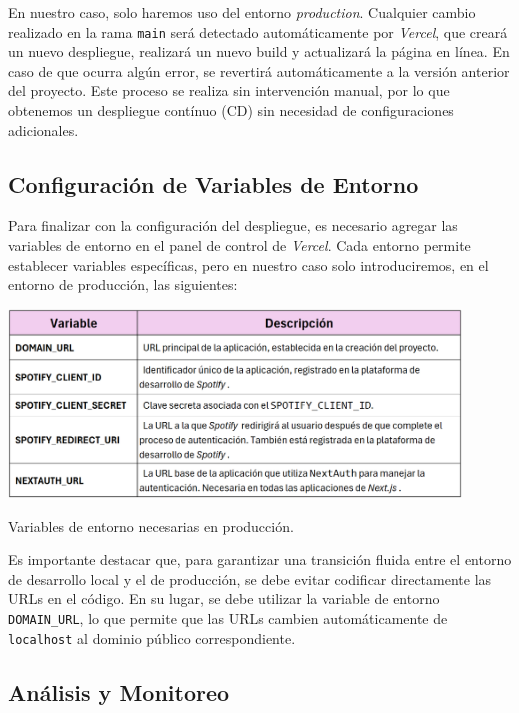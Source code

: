 En nuestro caso, solo haremos uso del entorno \textit{production}. Cualquier cambio realizado en la rama \texttt{main} será detectado automáticamente por \textit{Vercel}, que creará un nuevo despliegue, realizará un nuevo build y actualizará la página en línea. En caso de que ocurra algún error, se revertirá automáticamente a la versión anterior del proyecto. Este proceso se realiza sin intervención manual, por lo que obtenemos un despliegue contínuo (CD) sin necesidad de configuraciones adicionales.

\subsection{Configuración de Variables de Entorno}

Para finalizar con la configuración del despliegue, es necesario agregar las variables de entorno en el panel de control de \textit{Vercel}. Cada entorno permite establecer variables específicas, pero en nuestro caso solo introduciremos, en el entorno de producción, las siguientes:

\begin{table}[htbp]
    \centering
    \includegraphics[width=0.9\textwidth]{figures/despliegue/variables_entorno.png}
    \captionsetup{skip=10pt}
    \caption{Variables de entorno necesarias en producción.}
    \label{tab:variables_entorno}
\end{table}

Es importante destacar que, para garantizar una transición fluida entre el entorno de desarrollo local y el de producción, se debe evitar codificar directamente las URLs en el código. En su lugar, se debe utilizar la variable de entorno \texttt{DOMAIN\_URL}, lo que permite que las URLs cambien automáticamente de \texttt{localhost} al dominio público correspondiente.

\subsection{Análisis y Monitoreo}

